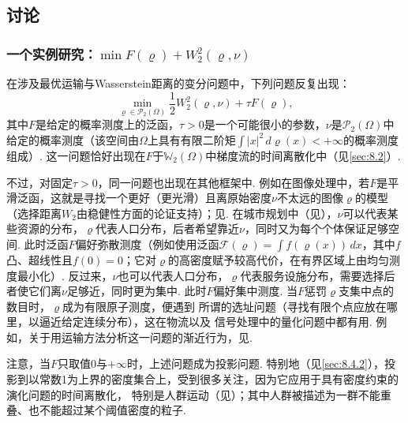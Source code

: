 \subsection{讨论}\label{sec:7.4}
\subsubsection[一个变分极小化问题的研究]{一个实例研究：$\min F(\varrho)+W_2^2(\varrho,\nu)$}\label{sec:7.4.1}
在涉及最优运输与Wasserstein距离的变分问题中，下列问题反复出现：
\begin{equation}\label{eq:7.2}
 \min_{\varrho\in\mathscr P_2(\Omega)}\frac12W_2^2(\varrho,\nu)+\tau F(\varrho),
\end{equation}
其中$F$是给定的概率测度上的泛函，$\tau>0$是一个可能很小的参数，$\nu$是$\mathscr P_2(\Omega)$中给定的概率测度（该空间由$\Omega$上具有有限二阶矩$\int|x|^2\,d\varrho(x)<+\infty$的概率测度组成）. 这一问题恰好出现在$F$于$\mathbb W_2(\Omega)$中梯度流的时间离散化中（见\autoref{sec:8.2}）.

不过，对固定$\tau>0$，同一问题也出现在其他框架中. \label{idx:i77-p277}
例如在图像处理中，若$F$是平滑泛函，这就是寻找一个更好（更光滑）且离原始密度$\nu$不太远的图像$\varrho$的模型（选择距离$W_2$由稳健性方面的论证支持）；见\cite{b92,b208}. \label{idx:i154-p277}
在城市规划中（见\cite{b93,b270}），$\nu$可以代表某些资源的分布，$\varrho$代表人口分布，后者希望靠近$\nu$，同时又为每个个体保证足够空间. 此时泛函$F$偏好弥散测度（例如使用泛函$\mathscr F(\varrho)=\int f(\varrho(x))\,dx$，其中$f$凸、超线性且$f(0)=0$；它对$\varrho$的高密度赋予较高代价，在有界区域上由均匀测度最小化）. 反过来，$\nu$也可以代表人口分布，$\varrho$代表服务设施分布，需要选择后者使它们离$\nu$足够近，同时更为集中. 此时$F$偏好集中测度. 当$F$惩罚$\varrho$支集中点的数目时，$\varrho$成为有限原子测度，便遇到\label{idx:i93-p277}
所谓的选址问题（寻找有限个点应放在哪里，以逼近给定连续分布），这在物流以及\label{idx:i124-p277}
信号处理中的量化问题中都有用. 例如，关于用运输方法分析这一问题的渐近行为，见\cite{b72,b75}.

注意，当$F$只取值$0$与$+\infty$时，上述问题成为投影问题. 特别地（见\autoref{sec:8.4.2}），投影到以常数1为上界的密度集合上，受到很多关注，因为它应用于具有密度约束的演化问题的时间离散化，\label{idx:i32-p277}
特别是人群运动（见\cite{b225,b265}）；其中人群被描述为一群不能重叠、也不能超过某个阈值密度的粒子.

